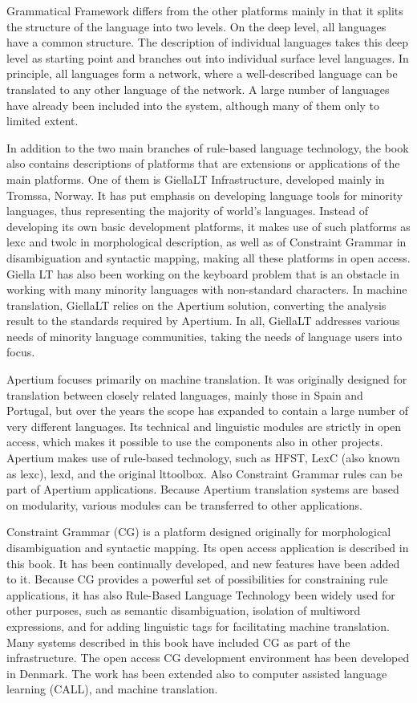 \documentclass[free]{flammie}
\begin{document}
Grammatical Framework differs from the other platforms mainly in that it splits the
structure of the language into two levels. On the deep level, all languages have a common
structure. The description of individual languages takes this deep level as starting point
and branches out into individual surface level languages. In principle, all languages form
a network, where a well-described language can be translated to any other language of the
network. A large number of languages have already been included into the system,
although many of them only to limited extent.

In addition to the two main branches of rule-based language technology, the book also
contains descriptions of platforms that are extensions or applications of the main
platforms. One of them is GiellaLT Infrastructure, developed mainly in Tromssa,
Norway. It has put emphasis on developing language tools for minority languages, thus
representing the majority of world’s languages. Instead of developing its own basic
development platforms, it makes use of such platforms as lexc and twolc in
morphological description, as well as of Constraint Grammar in disambiguation and
syntactic mapping, making all these platforms in open access. Giella LT has also been
working on the keyboard problem that is an obstacle in working with many minority
languages with non-standard characters. In machine translation, GiellaLT relies on the
Apertium solution, converting the analysis result to the standards required by Apertium.
In all, GiellaLT addresses various needs of minority language communities, taking the
needs of language users into focus.

Apertium focuses primarily on machine translation. It was originally designed for
translation between closely related languages, mainly those in Spain and Portugal, but
over the years the scope has expanded to contain a large number of very different
languages. Its technical and linguistic modules are strictly in open access, which makes it
possible to use the components also in other projects. Apertium makes use of rule-based
technology, such as HFST, LexC (also known as lexc), lexd, and the original lttoolbox.
Also Constraint Grammar rules can be part of Apertium applications. Because Apertium
translation systems are based on modularity, various modules can be transferred to other
applications.

Constraint Grammar (CG) is a platform designed originally for morphological
disambiguation and syntactic mapping. Its open access application is described in this
book. It has been continually developed, and new features have been added to it. Because
CG provides a powerful set of possibilities for constraining rule applications, it has also
Rule-Based Language Technology
been widely used for other purposes, such as semantic disambiguation, isolation of multiword expressions, and for adding linguistic tags for facilitating machine translation.
Many systems described in this book have included CG as part of the infrastructure. The
open access CG development environment has been developed in Denmark. The work
has been extended also to computer assisted language learning (CALL), and machine
translation.
\end{document}
